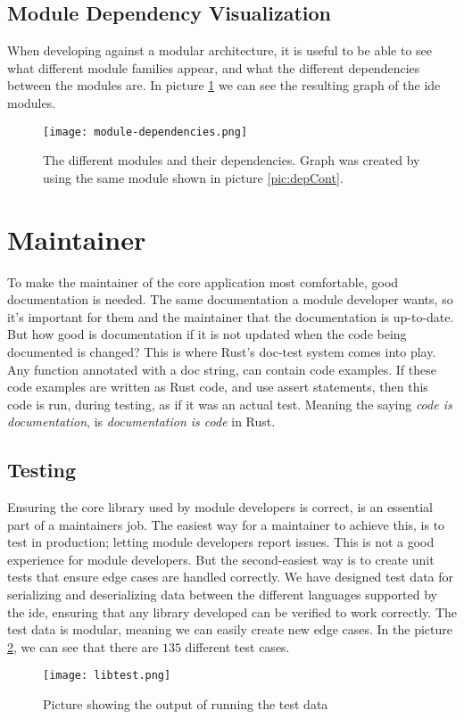 \subsection{Module Dependency Visualization}

When developing against a modular architecture, it is useful to be able to see
what different module families appear, and what the different dependencies
between the modules are. In picture \ref{pic:modDep} we can see the resulting
graph of the \gls*{ide} modules.

\begin{figure}[H]
  \centering
  \texttt{[image: module-dependencies.png]}
  \caption{
    The different modules and their dependencies. Graph was created by using the
    same module shown in picture \ref{pic:depCont}.
  }
  \label{pic:modDep}
\end{figure}


\section{Maintainer}

To make the maintainer of the core application most comfortable, good
documentation is needed. The same documentation a module developer wants, so
it's important for them and the maintainer that the documentation is up-to-date.
But how good is documentation if it is not updated when the code being
documented is changed? This is where Rust's doc-test system comes into play. Any
function annotated with a doc string, can contain code examples. If these code
examples are written as Rust code, and use assert statements, then this code is
run, during testing, as if it was an actual test. Meaning the saying
\textit{code is documentation}, is \textit{documentation is code} in Rust.

\subsection{Testing}

Ensuring the core library used by module developers is correct, is an essential
part of a maintainers job. The easiest way for a maintainer to achieve this, is
to test in production; letting module developers report issues. This is not a
good experience for module developers. But the second-easiest way is to create
unit tests that ensure edge cases are handled correctly. We have designed test
data for serializing and deserializing data between the different languages
supported by the \gls*{ide}, ensuring that any library developed can be
verified to work correctly. The test data is modular, meaning we can easily
create new edge cases. In the picture \ref{pic:libTest}, we can see that there
are $135$ different test cases.

\begin{figure}
  \centering
  \texttt{[image: libtest.png]}
  \caption{Picture showing the output of running the test data}
  \label{pic:libTest}
\end{figure}
